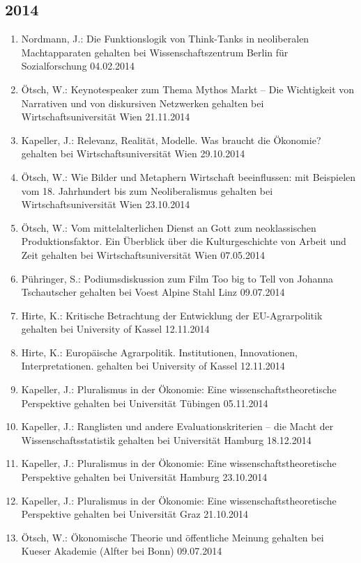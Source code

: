 \subsection*{2014}
\begin{enumerate}
	\item Nordmann, J.: Die Funktionslogik von Think-Tanks in neoliberalen Machtapparaten gehalten bei Wissenschaftszentrum Berlin für Sozialforschung 04.02.2014
	\item Ötsch, W.: Keynotespeaker zum Thema Mythos Markt – Die Wichtigkeit von Narrativen und von diskursiven Netzwerken gehalten bei Wirtschaftsuniversität Wien 21.11.2014
	\item Kapeller, J.: Relevanz, Realität, Modelle. Was braucht die Ökonomie? gehalten bei Wirtschaftsuniversität Wien 29.10.2014
	\item Ötsch, W.: Wie Bilder und Metaphern Wirtschaft beeinflussen: mit Beispielen vom 18. Jahrhundert bis zum Neoliberalismus gehalten bei Wirtschaftsuniversität Wien 23.10.2014
	\item Ötsch, W.: Vom mittelalterlichen Dienst an Gott zum neoklassischen Produktionsfaktor. Ein Überblick über die Kulturgeschichte von Arbeit und Zeit gehalten bei Wirtschaftsuniversität Wien 07.05.2014
	\item Pühringer, S.: Podiumsdiskussion zum Film Too big to Tell von Johanna Tschautscher gehalten bei Voest Alpine Stahl Linz 09.07.2014
	\item Hirte, K.: Kritische Betrachtung der Entwicklung der EU-Agrarpolitik gehalten bei University of Kassel 12.11.2014
	\item Hirte, K.: Europäische Agrarpolitik. Institutionen, Innovationen, Interpretationen. gehalten bei University of Kassel 12.11.2014
	\item Kapeller, J.: Pluralismus in der Ökonomie: Eine wissenschaftstheoretische Perspektive gehalten bei Universität Tübingen 05.11.2014
	\item Kapeller, J.: Ranglisten und andere Evaluationskriterien – die Macht der Wissenschaftsstatistik gehalten bei Universität Hamburg 18.12.2014
	\item Kapeller, J.: Pluralismus in der Ökonomie: Eine wissenschaftstheoretische Perspektive gehalten bei Universität Hamburg 23.10.2014
	\item Kapeller, J.: Pluralismus in der Ökonomie: Eine wissenschaftstheoretische Perspektive gehalten bei Universität Graz 21.10.2014
	\item Ötsch, W.: Ökonomische Theorie und öffentliche Meinung gehalten bei Kueser Akademie (Alfter bei Bonn) 09.07.2014

\end{enumerate}
